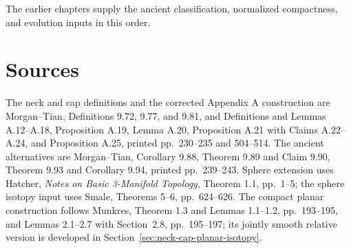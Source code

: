 The earlier chapters supply the ancient classification, normalized
compactness, and evolution inputs in this order.

\section*{Sources}

The neck and cap definitions and the corrected Appendix A construction are
Morgan--Tian, Definitions 9.72, 9.77, and 9.81, and Definitions and Lemmas
A.12--A.18, Proposition A.19, Lemma A.20, Proposition A.21 with
Claims A.22--A.24, and Proposition A.25, printed pp.~230--235 and
504--514.  The ancient alternatives are Morgan--Tian, Corollary 9.88,
Theorem 9.89 and Claim 9.90, Theorem 9.93 and Corollary 9.94, printed
pp.~239--243.  Sphere extension uses Hatcher, \emph{Notes on Basic 3-Manifold
Topology}, Theorem 1.1, pp.~1--5; the sphere isotopy input uses Smale,
Theorems 5--6, pp.~624--626.  The compact planar construction follows
Munkres, Theorem 1.3 and Lemmas 1.1--1.2, pp.~193--195, and Lemmas
2.1--2.7 with Section~2.8, pp.~195--197; its jointly smooth relative
version is developed in Section~\ref{sec:neck-cap-planar-isotopy}.

\cite[Appendix A, pp.~504--514; pp.~239--243]{MT2007}
\cite[Theorem 1.1, pp.~1--5]{Hatcher3M2014}
\cite[Theorems 5--6, pp.~624--626]{Smale1959}
